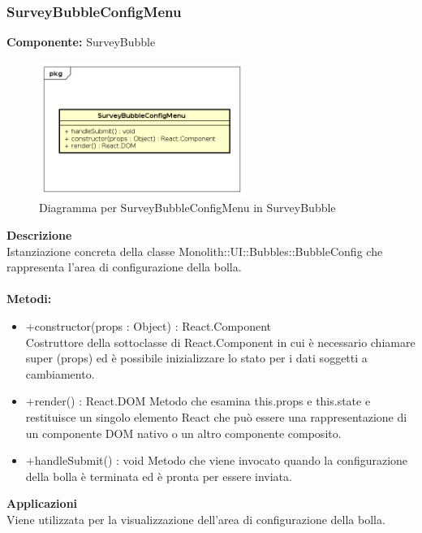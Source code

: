 \subsubsection{SurveyBubbleConfigMenu}
\textbf{Componente:}  SurveyBubble\\
   \FloatBarrier
   \begin{figure}[ht]
   \centering
   \includegraphics[width=0.6\textwidth]{img/single-SurveyBubbleConfigMenu}
   \caption{{Diagramma per SurveyBubbleConfigMenu in SurveyBubble}}
\end{figure}
\FloatBarrier
\textbf{Descrizione}\\
Istanziazione concreta della classe Monolith::UI::Bubbles::BubbleConfig che rappresenta l'area di configurazione della bolla. 
\\
\\
\textbf{Metodi:} 
\begin{itemize}
\item +constructor(props : Object) : React.Component 
\\
Costruttore della sottoclasse di React.Component in cui è necessario chiamare super (props) ed è possibile inizializzare lo stato per i dati soggetti a cambiamento.

\item +render() : React.DOM
Metodo che esamina this.props e this.state e restituisce un singolo elemento React che può essere una rappresentazione di un componente DOM nativo o un altro componente composito.

\item +handleSubmit() : void
Metodo che viene invocato quando la configurazione della bolla è terminata ed è pronta per essere inviata.

\end{itemize} 


\textbf{Applicazioni}\\
Viene utilizzata per la visualizzazione dell'area di configurazione della bolla. 


\clearpage

